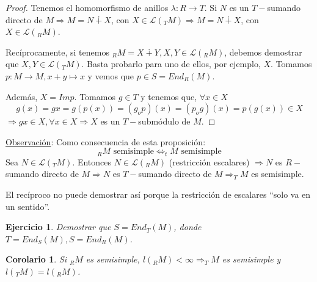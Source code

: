 \documentclass[11pt,a4paper]{article}
\theoremstyle{break}
\newtheorem{corollary}[theorem]{Corolario}
\newtheorem{task}[theorem]{Ejercicio}
\begin{document}
\begin{proof}
Tenemos el homomorfismo de anillos $\lambda: R \to T$. Si $N$ es un $T-$sumando directo de $M \Rightarrow M = N \dotplus X$, con $X \in \mathcal{L}(_{T}M) \Rightarrow M = N \dotplus X$, con $X \in \mathcal{L}(_{R}M)$.

Recíprocamente, si tenemos $_{R}M = X \dotplus Y, X, Y \in \mathcal{L}(_{R}M)$, debemos demostrar que $X, Y \in \mathcal{L}(_{T}M)$. Basta probarlo para uno de ellos, por ejemplo, $X$. Tomamos $p: M \to M, x+y \mapsto x$ y vemos que $p \in S = End_{R}(M)$.

Además, $X = Im p$. Tomamos $g \in T$ y tenemos que, $\forall x \in X$
$$g(x) = gx = g(p(x)) = (g_{o}p)(x) = (p_{o}g)(x) = p(g(x)) \in X$$
$\Rightarrow gx \in X, \forall x \in X \Rightarrow X$ es un $T-$submódulo de $M$.
\end{proof}

\underline{Observación}: Como consecuencia de esta proposición:
$$_{R}M \text{ semisimple} \iff _{t}M \text{ semisimple}$$
Sea $N \in \mathcal{L}(_{T}M)$. Entonces $N \in \mathcal{L}(_{R}M)$ (restricción escalares) $\Rightarrow N$ es $R-$sumando directo de $M \Rightarrow N$ es $T-$sumando directo de $M \Rightarrow _{T}M$ es semisimple.

El recíproco no puede demostrar así porque la restricción de escalares ``solo va en un sentido''.


\begin{task}
Demostrar que $S = End_{T}(M)$, donde $T = End_{S}(M), S = End_{R}(M)$.
\end{task}

\begin{corollary}
Si $_{R}M$ es semisimple, $l(_{R}M) < \infty \Rightarrow _{T}M$ es semisimple y $l(_{T}M) = l(_{R}M)$.
\end{corollary}
\end{document}
